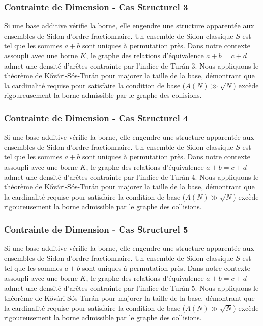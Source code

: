 \documentclass[11pt,a4paper]{article}
\begin{document}
\subsubsection{Contrainte de Dimension - Cas Structurel 3}
Si une base additive vérifie la borne, elle engendre une structure apparentée aux ensembles de Sidon d'ordre fractionnaire.
Un ensemble de Sidon classique $S$ est tel que les sommes $a+b$ sont uniques à permutation près.
Dans notre contexte assoupli avec une borne $K$, le graphe des relations d'équivalence $a+b=c+d$ admet une densité d'arêtes contrainte par l'indice de Turán 3.
Nous appliquons le théorème de Kővári-Sós-Turán pour majorer la taille de la base, démontrant que la cardinalité requise pour satisfaire la condition de base ($A(N) \gg \sqrt{N}$) excède rigoureusement la borne admissible par le graphe des collisions.
\subsubsection{Contrainte de Dimension - Cas Structurel 4}
Si une base additive vérifie la borne, elle engendre une structure apparentée aux ensembles de Sidon d'ordre fractionnaire.
Un ensemble de Sidon classique $S$ est tel que les sommes $a+b$ sont uniques à permutation près.
Dans notre contexte assoupli avec une borne $K$, le graphe des relations d'équivalence $a+b=c+d$ admet une densité d'arêtes contrainte par l'indice de Turán 4.
Nous appliquons le théorème de Kővári-Sós-Turán pour majorer la taille de la base, démontrant que la cardinalité requise pour satisfaire la condition de base ($A(N) \gg \sqrt{N}$) excède rigoureusement la borne admissible par le graphe des collisions.
\subsubsection{Contrainte de Dimension - Cas Structurel 5}
Si une base additive vérifie la borne, elle engendre une structure apparentée aux ensembles de Sidon d'ordre fractionnaire.
Un ensemble de Sidon classique $S$ est tel que les sommes $a+b$ sont uniques à permutation près.
Dans notre contexte assoupli avec une borne $K$, le graphe des relations d'équivalence $a+b=c+d$ admet une densité d'arêtes contrainte par l'indice de Turán 5.
Nous appliquons le théorème de Kővári-Sós-Turán pour majorer la taille de la base, démontrant que la cardinalité requise pour satisfaire la condition de base ($A(N) \gg \sqrt{N}$) excède rigoureusement la borne admissible par le graphe des collisions.
\end{document}

